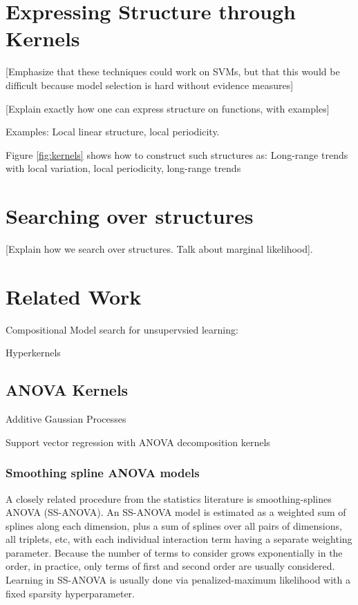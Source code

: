 \documentclass[twoside]{article}
\begin{document}
\section{Expressing Structure through Kernels}

[Emphasize that these techniques could work on SVMs, but that this would be difficult because model selection is hard without evidence measures]

[Explain exactly how one can express structure on functions, with examples]

Examples: Local linear structure, local periodicity.

Figure \ref{fig:kernels} shows how to construct such structures as:  Long-range trends with local variation, local periodicity, long-range trends 




\section{Searching over structures}

[Explain how we search over structures.  Talk about marginal likelihood].

\section{Related Work}

Compositional Model search for unsupervsied learning: \cite{grosse2012exploiting}

Hyperkernels \cite{ong2002hyperkernels}

\subsection{ANOVA Kernels}

Additive Gaussian Processes \cite{duvenaud2011additive11}

Support vector regression with ANOVA decomposition kernels \cite{stitson1999support}

\subsubsection{Smoothing spline ANOVA models}

A closely related procedure from the statistics literature is smoothing-splines ANOVA (SS-ANOVA)\cite{wahba1990spline, gu2002smoothing}. An SS-ANOVA model is estimated as a weighted sum of splines along each dimension, plus a sum of splines over all pairs of dimensions, all triplets, etc, with each individual interaction term having a separate weighting parameter.  Because the number of terms to consider grows exponentially in the order, in practice, only terms of first and second order are usually considered.  Learning in SS-ANOVA is usually done via penalized-maximum likelihood with a fixed sparsity hyperparameter.
\end{document}
